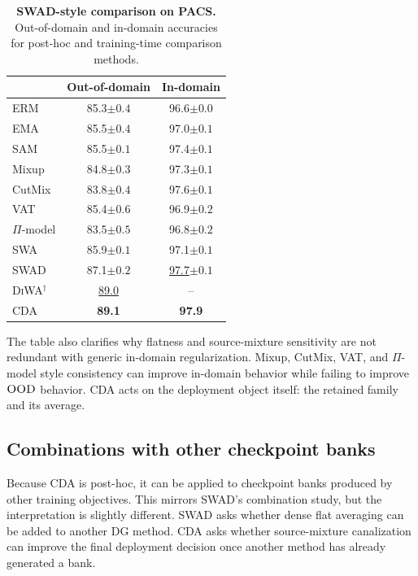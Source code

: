 \documentclass{article}
\newcommand{\data}[1]{\textsc{#1}}
\theoremstyle{definition}
\newcommand{\cda}{\textup{\textsc{CDA}}}
\newcommand{\erm}{\textup{\textsc{ERM}}}
\newcommand{\swad}{\textup{\textsc{SWAD}}}
\newcommand{\diwa}{\textup{\textsc{DiWA}}}
\newcommand{\ood}{\textup{\textsc{OOD}}}
\newcommand{\tabfont}{\scriptsize}
\begin{document}
\begin{table}[t]
\centering
\tabfont
\caption{\textbf{SWAD-style comparison on \data{PACS}.} Out-of-domain and in-domain accuracies for post-hoc and training-time comparison methods.}
\label{tab:generalization_cda}
\begin{tabular}{@{}lcc@{}}
\toprule
& \multicolumn{1}{c}{Out-of-domain} & \multicolumn{1}{c}{In-domain} \\
\midrule
\erm{} & 85.3\scriptsize{$\pm0.4$} & 96.6\scriptsize{$\pm0.0$} \\
EMA & 85.5\scriptsize{$\pm0.4$} & 97.0\scriptsize{$\pm0.1$} \\
SAM & 85.5\scriptsize{$\pm0.1$} & 97.4\scriptsize{$\pm0.1$} \\
Mixup & 84.8\scriptsize{$\pm0.3$} & 97.3\scriptsize{$\pm0.1$} \\
CutMix & 83.8\scriptsize{$\pm0.4$} & 97.6\scriptsize{$\pm0.1$} \\
VAT & 85.4\scriptsize{$\pm0.6$} & 96.9\scriptsize{$\pm0.2$} \\
$\Pi$-model & 83.5\scriptsize{$\pm0.5$} & 96.8\scriptsize{$\pm0.2$} \\
\midrule
SWA & 85.9\scriptsize{$\pm0.1$} & 97.1\scriptsize{$\pm0.1$} \\
\swad{} & 87.1\scriptsize{$\pm0.2$} & \underline{97.7}\scriptsize{$\pm0.1$} \\
\diwa{}$^\dagger$ & \underline{89.0} & -- \\
\cda{} & \textbf{89.1} & \textbf{97.9} \\
\bottomrule
\end{tabular}
\end{table}

The table also clarifies why flatness and source-mixture sensitivity are not redundant with generic in-domain regularization. Mixup, CutMix, VAT, and \(\Pi\)-model style consistency can improve in-domain behavior while failing to improve \(\ood\) behavior. CDA acts on the deployment object itself: the retained family and its average.

\subsection{Combinations with other checkpoint banks}

Because CDA is post-hoc, it can be applied to checkpoint banks produced by other training objectives. This mirrors SWAD's combination study, but the interpretation is slightly different. SWAD asks whether dense flat averaging can be added to another DG method. CDA asks whether source-mixture canalization can improve the final deployment decision once another method has already generated a bank.
\end{document}
